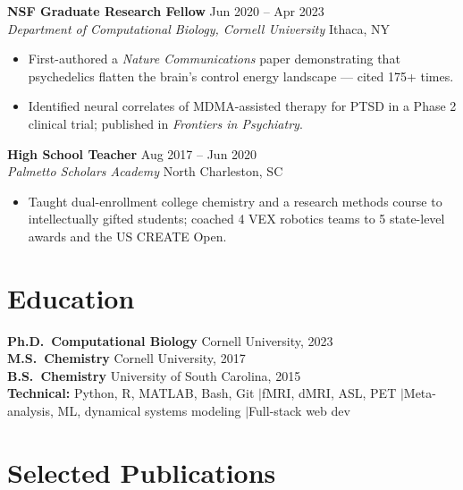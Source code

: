\documentclass[10pt, letterpaper]{article}
\newcommand{\roleentry}[4]{%
  \textbf{#1} \hfill \textcolor{light}{\small #2} \\[-0.15em]
  {\small\textit{#3} \hfill #4}
  \vspace{0.1em}
}
\begin{document}
\roleentry{NSF Graduate Research Fellow}{Jun 2020 -- Apr 2023}
  {Department of Computational Biology, Cornell University}{Ithaca, NY}
\begin{itemize}
  \item First-authored a \textit{Nature Communications} paper demonstrating that psychedelics flatten the brain's control energy landscape --- cited 175+ times.
  \item Identified neural correlates of MDMA-assisted therapy for PTSD in a Phase 2 clinical trial; published in \textit{Frontiers in Psychiatry}.
\end{itemize}
\vspace{0.1em}

\roleentry{High School Teacher}{Aug 2017 -- Jun 2020}
  {Palmetto Scholars Academy}{North Charleston, SC}
\begin{itemize}
  \item Taught dual-enrollment college chemistry and a research methods course to intellectually gifted students; coached 4 VEX robotics teams to 5 state-level awards and the US CREATE Open.
\end{itemize}

\section{Education}

\textbf{Ph.D.\ Computational Biology} \hfill Cornell University, 2023 \\
\textbf{M.S.\ Chemistry} \hfill Cornell University, 2017 \\
\textbf{B.S.\ Chemistry} \hfill University of South Carolina, 2015 \\[0.2em]
{\small\textbf{Technical:} Python, R, MATLAB, Bash, Git \enspace$\vert$\enspace fMRI, dMRI, ASL, PET \enspace$\vert$\enspace Meta-analysis, ML, dynamical systems modeling \enspace$\vert$\enspace Full-stack web dev}

\section{Selected Publications}
\end{document}
